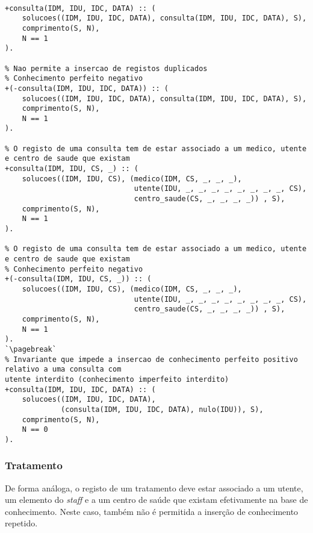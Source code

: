 \

\begin{lstlisting}[caption={Invariantes de inserção relativos ao predicado \texttt{consulta}}]
% Nao permite a insercao de registos duplicados
+consulta(IDM, IDU, IDC, DATA) :: (
    solucoes((IDM, IDU, IDC, DATA), consulta(IDM, IDU, IDC, DATA), S),
    comprimento(S, N),
    N == 1
).

% Nao permite a insercao de registos duplicados
% Conhecimento perfeito negativo
+(-consulta(IDM, IDU, IDC, DATA)) :: (
    solucoes((IDM, IDU, IDC, DATA), consulta(IDM, IDU, IDC, DATA), S),
    comprimento(S, N),
    N == 1
).

% O registo de uma consulta tem de estar associado a um medico, utente e centro de saude que existam
+consulta(IDM, IDU, CS, _) :: (
    solucoes((IDM, IDU, CS), (medico(IDM, CS, _, _, _),
                              utente(IDU, _, _, _, _, _, _, _, _, CS),
                              centro_saude(CS, _, _, _, _)) , S),
    comprimento(S, N),
    N == 1
).

% O registo de uma consulta tem de estar associado a um medico, utente e centro de saude que existam
% Conhecimento perfeito negativo
+(-consulta(IDM, IDU, CS, _)) :: (
    solucoes((IDM, IDU, CS), (medico(IDM, CS, _, _, _),
                              utente(IDU, _, _, _, _, _, _, _, _, CS),
                              centro_saude(CS, _, _, _, _)) , S),
    comprimento(S, N),
    N == 1
).
`\pagebreak`
% Invariante que impede a insercao de conhecimento perfeito positivo relativo a uma consulta com 
utente interdito (conhecimento imperfeito interdito)
+consulta(IDM, IDU, IDC, DATA) :: (
    solucoes((IDM, IDU, IDC, DATA),
             (consulta(IDM, IDU, IDC, DATA), nulo(IDU)), S),
    comprimento(S, N),
    N == 0
).
\end{lstlisting}

\subsubsection*{Tratamento}
De forma análoga, o registo de um tratamento deve estar associado a um utente, um elemento do 
\textit{staff} e a um centro
de saúde que existam efetivamente na base de conhecimento. Neste caso, também não é permitida a 
inserção de
conhecimento repetido.

\


